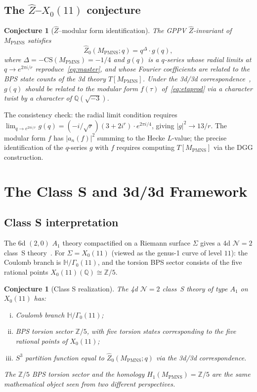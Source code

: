 \documentclass[11pt,a4paper]{article}
\newtheorem{conjecture}[theorem]{Conjecture}
\theoremstyle{definition}
\newcommand{\MPMNS}{M_{\mathrm{PMNS}}}
\newcommand{\ZZ}{\mathbb{Z}}
\newcommand{\QQ}{\mathbb{Q}}
\newcommand{\CS}{\mathrm{CS}}
\begin{document}
\subsection{The $\hat{Z}$--$X_0(11)$ conjecture}

\begin{conjecture}[$\hat{Z}$--modular form identification]
\label{conj:zhat}
The GPPV $\hat{Z}$-invariant of $\MPMNS$ satisfies
\begin{equation}
\hat{Z}_0(\MPMNS;q) = q^{\Delta}\cdot g(q),
\label{eq:zhat_conj}
\end{equation}
where $\Delta = -\CS(\MPMNS) = -1/4$ and $g(q)$ is a $q$-series
whose radial limits at $q \to e^{2\pi i/r}$ reproduce~\eqref{eq:master},
and whose Fourier coefficients are related to the BPS state counts of
the 3d theory $T[\MPMNS]$.
Under the 3d/3d correspondence~\cite{DGG14}, $g(q)$ should be
related to the modular form $f(\tau)$ of~\eqref{eq:etaprod}
via a character twist by a character of $\QQ(\sqrt{-3})$.
\end{conjecture}

The consistency check: the radial limit condition requires
$\lim_{q\to e^{2\pi i/r}} g(q) = (-i/\sqrt{r})(3+2i^r) \cdot e^{2\pi i/4}$,
giving $|g|^2 \to 13/r$.
The modular form $f$ has $|a_n(f)|^2$ summing to the Hecke $L$-value;
the precise identification of the $q$-series $g$ with $f$ requires
computing $T[\MPMNS]$ via the DGG construction.

\section{The Class S and 3d/3d Framework}
\label{sec:class_s}

\subsection{Class S interpretation}

The 6d $(2,0)$ $A_1$ theory compactified on a Riemann surface $\Sigma$
gives a 4d $\mathcal{N}=2$ class~S theory~\cite{Gaiotto12}.
For $\Sigma = X_0(11)$ (viewed as the genus-1 curve of level $11$):
the Coulomb branch is $\mathbb{H}/\Gamma_0(11)$,
and the torsion BPS sector consists of the five rational points
$X_0(11)(\QQ) \cong \ZZ/5$.

\begin{conjecture}[Class S realization]
\label{conj:class_s}
The 4d $\mathcal{N}=2$ class~S theory of type $A_1$ on $X_0(11)$ has:
\begin{enumerate}[(i)]
\item Coulomb branch $\mathbb{H}/\Gamma_0(11)$;
\item BPS torsion sector $\ZZ/5$, with five torsion states corresponding
  to the five rational points of $X_0(11)$;
\item $S^3$ partition function equal to $\hat{Z}_0(\MPMNS;q)$
  via the 3d/3d correspondence.
\end{enumerate}
The $\ZZ/5$ BPS torsion sector and the homology $H_1(\MPMNS) = \ZZ/5$
are the same mathematical object seen from two different perspectives.
\end{conjecture}
\end{document}
